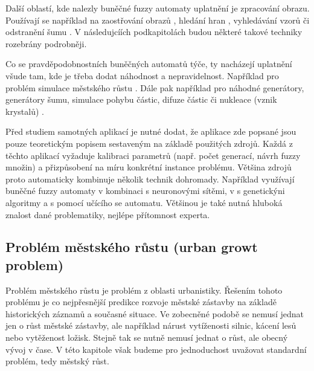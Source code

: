 \documentclass[a4paper,10pt]{article}
\begin{document}
Další oblastí, kde nalezly buněčné fuzzy automaty uplatnění je zpracování obrazu. Používají se například na zaostřování obrazů \cite{MarMeySol-HybMetGasDifModFuzCelAutImSha}\cite{ZhaLiZha-EdgDetImaBasFuzCelAut}, hledání hran \cite{NayPatMah-SurTwDimCelAutAppImProc}\cite{MarMeySol-HybMetGasDifModFuzCelAutImSha}, vyhledávání vzorů \cite{WanJiaZhoDu-ImProcBasFuzCelAuMod}\cite{MajCha-FuzCelAutModPatClas} či odstranění šumu \cite{SadRetKam-EfMetImpNoiRedImFuzCelAut}\cite{SahUguSah-SalPepNoiFilFuzCelAut}\cite{NayPatMah-SurTwDimCelAutAppImProc}. V následujcíích podkapitolách budou některé takové techniky rozebrány podrobněji.

Co se pravděpodobnostních buněčných automatů týče, ty nacházejí uplatnění všude tam, kde je třeba dodat náhodnost a nepravidelnost. Například pro problém simulace městského růstu\cite{War+-StoConCelModUrbGro} \cite{Wu-CalStoCelAutAppRurUrbLanConv}. Dále pak například pro náhodné generátory, generátory šumu, simulace pohybu částic, difuze částic či nukleace (vznik krystalů) \cite{TofMar-CelAuMach+.pdf}.

Před studiem samotných aplikací je nutné dodat, že aplikace zde popsané jsou pouze teoretickým popisem sestaveným na základě použitých zdrojů. Každá z těchto aplikací vyžaduje kalibraci parametrů (např. počet generací, návrh fuzzy množin) a přizpůsobení na míru konkrétní instance problému. Většina zdrojů proto automaticky kombinuje několik technik dohromady. Například \cite{LiYe-NeuNetBasCelAutSim+} \cite{YehLi-SimLanDevIntCelAutMulCriEv} využívají buněčné fuzzy automaty v kombinaci s neuronovými sítěmi, v \cite{Ahm+-CalFuzCelAutModUrbDynSauAr} s genetickýni algoritmy a \cite{MarMeySol-HybMetGasDifModFuzCelAutImSha} \cite{MofSadRezMey-CelEdDetComCelAuCelLeaAu} s pomocí učícího se automatu.  Většinou je také nutná hluboká znalost dané problematiky, nejlépe přítomnost experta.

\subsection{Problém městského růstu (urban growt problem)}
Problém městského růstu je problém z oblasti urbanistiky. Řešením tohoto problému je co nejpřesnější predikce rozvoje městské zástavby na základě historických záznamů a současné situace. Ve zobecněné podobě se nemusí jednat jen o růst městské zástavby, ale například nárust vytíženosti silnic, kácení lesů nebo vytěženost ložisk. Stejně tak se nutně nemusí jednat o růst, ale obecný vývoj v čase. V této kapitole však budeme pro jednoduchost uvažovat standardní problém, tedy městský růst.
\end{document}
